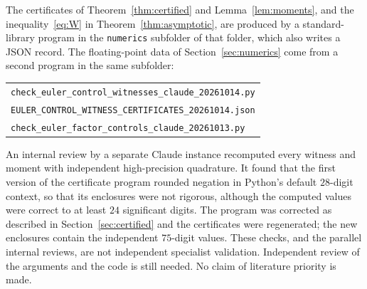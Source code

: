 \documentclass[11pt]{article}
\numberwithin{equation}{section}
\theoremstyle{definition}
\theoremstyle{remark}
\begin{document}
The certificates of Theorem~\ref{thm:certified} and Lemma~\ref{lem:moments},
and the inequality~\eqref{eq:W} in Theorem~\ref{thm:asymptotic}, are produced
by a standard-library program in the \texttt{numerics} subfolder of that
folder, which also writes a JSON record. The floating-point data of
Section~\ref{sec:numerics} come from a second program in the same
subfolder:
\begin{center}\small
\begin{tabular}{l}
\texttt{check\_euler\_control\_witnesses\_claude\_20261014.py}\\
\texttt{EULER\_CONTROL\_WITNESS\_CERTIFICATES\_20261014.json}\\
\texttt{check\_euler\_factor\_controls\_claude\_20261013.py}
\end{tabular}
\end{center}
An internal review by a separate Claude instance recomputed every witness
and moment with independent high-precision quadrature. It found that the
first version of the certificate program rounded negation in Python's
default $28$-digit context, so that its enclosures were not rigorous,
although the computed values were correct to at least $24$ significant
digits. The program was
corrected as described in Section~\ref{sec:certified} and the certificates
were regenerated; the new enclosures contain the independent $75$-digit
values. These checks, and the parallel internal reviews, are not
independent specialist validation. Independent review of the arguments and
the code is still needed. No claim of literature priority is made.
\end{document}
